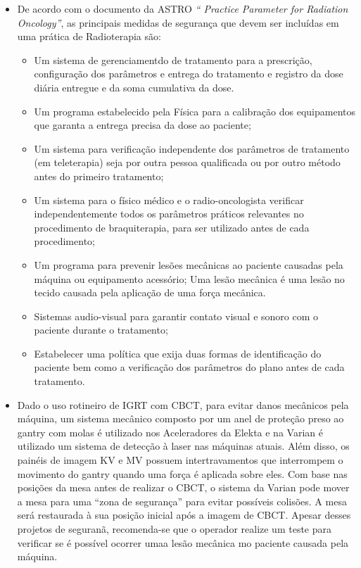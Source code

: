 \documentclass[11pt,a4paper]{article}
\newcounter{exemplo}
\begin{document}
\begin{exemplo}[Qualidade]
\begin{itemize}
        \item De acordo com o documento da ASTRO \textit{`` Practice Parameter for Radiation Oncology''}, as principais medidas de segurança que devem ser incluídas em uma prática de Radioterapia são:
            \begin{itemize}[label=\textcolor{CarnationPink}{$\star$}]
                \item Um sistema de gerenciamentdo de tratamento para a prescrição, configuração dos parâmetros e entrega do tratamento e registro da dose diária entregue e da soma cumulativa da dose.
                \item Um programa estabelecido pela Física para a calibração dos equipamentos que garanta a entrega precisa da dose ao paciente;
                \item Um sistema para verificação independente dos parâmetros de tratamento (em teleterapia) seja por outra pessoa qualificada ou por outro método antes do primeiro tratamento;
                \item Um sistema para o físico médico e o radio-oncologista verificar independentemente todos os parâmetros práticos relevantes no procedimento de braquiterapia, para ser utilizado antes de cada procedimento;
                \item Um programa para prevenir lesões mecânicas ao paciente causadas pela máquina ou equipamento acessório; Uma lesão mecânica é uma lesão no tecido causada pela aplicação de uma força mecânica.
                \item Sistemas audio-visual para garantir contato visual e sonoro com o paciente durante o tratamento;
                \item Estabelecer uma política que exija duas formas de identificação do paciente bem como a verificação dos parâmetros do plano antes de cada tratamento. 
            \end{itemize}
        
        \item Dado o uso rotineiro de IGRT com CBCT, para evitar danos mecânicos pela máquina, um sistema mecânico composto por um anel de proteção preso ao gantry com molas é utilizado nos Aceleradores da Elekta e na Varian é utilizado um sistema de detecção à laser nas máquinas atuais. Além disso, os painéis de imagem KV e MV possuem intertravamentos que interrompem o movimento do gantry quando uma força é aplicada sobre eles. Com base nas posições da mesa antes de realizar o CBCT, o sistema da Varian pode mover a mesa para uma ``zona de segurança'' para evitar possíveis colisões. A mesa será restaurada à sua posição inicial após a imagem de CBCT. Apesar desses projetos de seguranã, recomenda-se que o operador realize um teste para verificar se é possível ocorrer umaa lesão mecânica mo paciente causada pela máquina. 
        

\end{itemize}
\end{exemplo}
\end{document}
